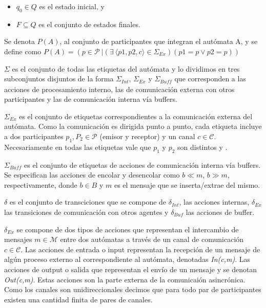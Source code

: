 \begin{definition}
\begin{itemize}
\item $q_0 \in Q$ es el estado inicial, y
\item $F \subseteq Q$ es el conjunto de estados finales. 
\end{itemize}

Se denota $P(A)$, al conjunto de participantes que integran el autómata A, y se define como $P(A) = \left(p \in \mathcal{P} \ | \left(\exists\ \langle p1,p2,c\rangle \in \Sigma_\mathit{Ex}\right)\left(p1=p \lor p2=p\right) \right) $ 
\end{definition}

$\Sigma$ es el conjunto de todas las etiquetas del autómata y lo dividimos en tres subconjuntos disjuntos de la forma $\Sigma_{\mathit{Int}}$, $\Sigma_{\mathit{Ex}}$ y $\Sigma_{\mathit{Buff}}$ que corresponden a las acciones de procesamiento interno, las de comunicación externa con otros participantes y las de comunicación interna vía buffers.

$\Sigma_{Ex}$ es el conjunto de etiquetas correspondientes a la comunicación externa del autómata. Como la comunicación es dirigida punto a punto, cada etiqueta incluye a dos participantes $p_1, P_2 \in \mathcal{P}$ (emisor y receptor) y un canal $c \in \mathcal{C}$. Necesariamente en todas las etiquetas vale que $p_1$ y $p_2$ son distintos y .

$\Sigma_{Buff}$ es el conjunto de etiquetas de acciones de comunicación interna vía buffers. Se especifican las acciones de encolar y desencolar como $b \ll m$, $b \gg m$, respectivamente, donde $b \in B$ y $m$ es el mensaje que se inserta/extrae del mismo.

$\delta$ es el conjunto de transciciones que se compone de $\delta_{Int}$, las acciones internas, $\delta_{Ex}$ las transiciones de comunicación con otros agentes y $\delta_{Buf}$ las acciones de buffer.

$\delta_{Ex}$ se compone de dos tipos de acciones que representan el intercambio de mensajes $m \in \mathcal{M}$ entre dos autómatas a través de un canal de comunicación $c \in \mathcal{C}$. Las acciones de entrada o input representan la recepción de un mensaje de algún proceso externo al correspondiente al autómata, denotadas \textit{In(c,m)}. Las acciones de output o salida que representan el envío de un mensaje y se denotan \textit{Out(c,m)}. Estas acciones son la parte externa de la comunicaión asincrónica. Como los canales son unidireccionales decimos que para todo par de participantes existen una cantidad finita de pares de canales.

